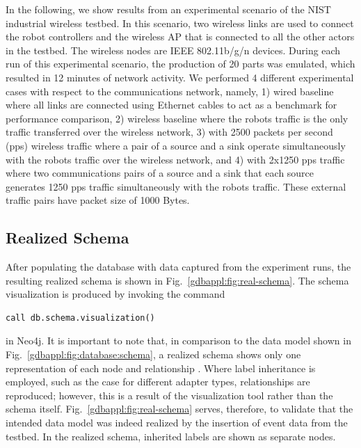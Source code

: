 In the following, we show results from an experimental scenario of the NIST industrial wireless testbed. In this scenario, two wireless links are used to connect the robot controllers and the wireless AP that is connected to all the other actors in the testbed. The wireless nodes are IEEE 802.11b/g/n devices. During each run of this experimental scenario, the production of 20 parts was emulated, which resulted in 12 minutes of network activity. We performed 4 different experimental cases with respect to the communications network, namely, 1) wired baseline where all links are connected using Ethernet cables to act as a benchmark for performance comparison, 2) wireless baseline where the robots traffic is the only traffic transferred over the wireless network, 3) with 2500 packets per second (pps) wireless traffic where a pair of a source and a sink operate simultaneously with the robots traffic over the wireless network, and 4) with 2x1250 pps traffic where two communications pairs of a source and a sink that each source generates 1250 pps traffic simultaneously with the robots traffic. These external traffic pairs have packet size of 1000 Bytes.        
\subsection{Realized Schema}

After populating the database with data captured from the experiment runs, the resulting realized schema is shown in Fig.~\ref{gdbappl:fig:real-schema}. The schema visualization is produced by invoking the command

\begin{lstlisting}
call db.schema.visualization()
\end{lstlisting} 
in Neo4j. It is important to note that, in comparison to the data model shown in Fig.~\ref{gdbappl:fig:database:schema}, a realized schema shows only one representation of each node and relationship . Where label inheritance is employed, such as the case for different adapter types, relationships are reproduced; however, this is a result of the visualization tool rather than the schema itself. Fig.~\ref{gdbappl:fig:real-schema} serves, therefore, to validate that the intended data model was indeed realized by the insertion of event data from the testbed. In the realized schema, inherited labels are shown as separate nodes.



